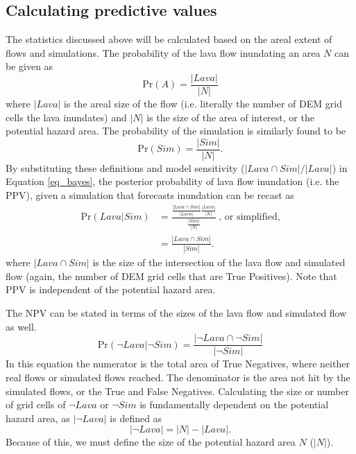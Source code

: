		\subsection{Calculating predictive values} The statistics discussed above will be calculated based on the areal extent of flows and simulations. The probability of the lava flow inundating an area $N$ can be given as
		\begin{equation}
			\text{Pr}(A)=\frac{|Lava|}{|N|}\label{eq_PA}
		\end{equation}
		where $|Lava|$ is the areal size of the flow (i.e. literally the number of DEM grid cells the lava inundates) and $|N|$ is the size of the area of interest, or the potential hazard area. The probability of the simulation is similarly found to be
		\begin{equation}
			\text{Pr}(Sim)=\frac{|Sim|}{|N|}.\label{eq_PB}
		\end{equation}
		By substituting these definitions and model sensitivity ($|Lava \cap Sim|/|Lava|$) in Equation \ref{eq_bayes}, the posterior probability of lava flow inundation (i.e. the PPV), given a simulation that forecasts inundation can be recast as
		\begin{align}
		\text{Pr}(Lava|Sim)&=\frac{\frac{|Lava\cap Sim|}{|Lava|}\frac{|Lava|}{|N|}}{\frac{|Sim|}{|N|}}~\text{,~or~simplified,}\label{eq_unsimplepost}\\
		&=\frac{|Lava\cap Sim|}{|Sim|}.\label{eq_simplepost}
		\end{align}
		where $|Lava\cap Sim|$ is the size of the intersection of the lava flow and simulated flow (again, the number of DEM grid cells that are True Positives). Note that PPV is independent of the potential hazard area.
		
		The NPV can be stated in terms of the sizes of the lava flow and simulated flow as well.
		\begin{equation}
			\text{Pr}(\neg Lava|\neg Sim)=\frac{|\neg Lava\cap \neg Sim|}{|\neg Sim|}\label{eq_simplenegpost}
		\end{equation}
		In this equation the numerator is the total area of True Negatives, where neither real flows or simulated flows reached. The denominator is the area not hit by the simulated flows, or the True and False Negatives. Calculating the size or number of grid cells of $\neg Lava$ or $\neg Sim$ is fundamentally dependent on the potential hazard area, as $|\neg Lava|$ is defined as
		\begin{equation}
			|\neg Lava| = |N| - |Lava|.
		\end{equation}
		Because of this, we must define the size of the potential hazard area $N$ ($|N|$).	
	
